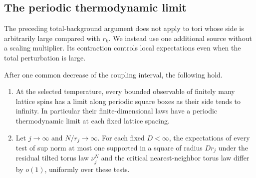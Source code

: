 \subsection{The periodic thermodynamic limit}

The preceding total-background argument does not apply to tori whose
side is arbitrarily large compared with $r_k$. We instead use one
additional source without a scaling multiplier. Its contraction
controls local expectations even when the total perturbation is large.

\begin{samepage}
\begin{proposition}
\label{src:plane}
After one common decrease of the coupling interval, the following hold.
\begin{enumerate}
 \item At the selected temperature, every bounded observable of finitely
 many lattice spins has a limit along periodic square boxes as their
 side tends to infinity. In particular their finite-dimensional laws
 have a periodic thermodynamic limit at each fixed lattice spacing.
 \item Let $j\to\infty$ and $N/r_j\to\infty$. For each fixed $D<\infty$,
 the expectations of every test of sup norm at most one supported in a
 square of radius $D r_j$ under the residual tilted torus law
 $\nu_j^N$ and the critical nearest-neighbor torus law differ by
 $o(1)$, uniformly over these tests.
\end{enumerate}
\end{proposition}
\end{samepage}

